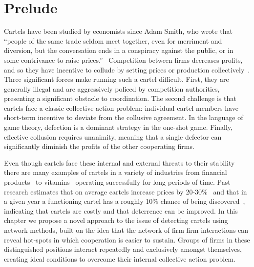 \section{Prelude}
Cartels have been studied by economists since Adam Smith, who wrote that ``people of the same trade seldom meet together, even for merriment and diversion, but the conversation ends in a conspiracy against the public, or in some contrivance to raise prices.''~\cite{smith2003wealth} Competition between firms decreases profits, and so they have incentive to collude by setting prices or production collectively~\cite{marshall2012economics}. Three significant forces make running such a cartel difficult. First, they are generally illegal and are aggressively policed by competition authorities, presenting a significant obstacle to coordination. The second challenge is that cartels face a classic collective action problem: individual cartel members have short-term incentive to deviate from the collusive agreement. In the language of game theory, defection is a dominant strategy in the one-shot game. Finally, effective collusion requires unanimity, meaning that a single defector can significantly diminish the profits of the other cooperating firms.

Even though cartels face these internal and external threats to their stability there are many examples of cartels in a variety of industries from financial products~\cite{abrantes2012lessons} to vitamins~\cite{harrington2011private} operating successfully for long periods of time. Past research estimates that on average cartels increase prices by 20-30\%~\cite{connor2006cartel} and that in a given year a functioning cartel has a roughly 10\% chance of being discovered~\cite{combe2008cartels}, indicating that cartels are costly and that deterrence can be improved. In this chapter we propose a novel approach to the issue of detecting cartels using network methods, built on the idea that the network of firm-firm interactions can reveal hot-spots in which cooperation is easier to sustain. Groups of firms in these distinguished positions interact repeatedly and exclusively amongst themselves, creating ideal conditions to overcome their internal collective action problem.

